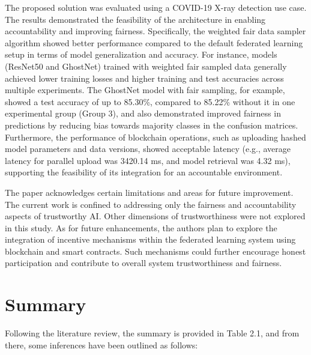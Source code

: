 The proposed solution was evaluated using a COVID-19 X-ray detection use case. The results demonstrated the feasibility of the architecture in enabling accountability and improving fairness. Specifically, the weighted fair data sampler algorithm showed better performance compared to the default federated learning setup in terms of model generalization and accuracy. For instance, models (ResNet50 and GhostNet) trained with weighted fair sampled data generally achieved lower training losses and higher training and test accuracies across multiple experiments. The GhostNet model with fair sampling, for example, showed a test accuracy of up to 85.30\%, compared to 85.22\% without it in one experimental group (Group 3), and also demonstrated improved fairness in predictions by reducing bias towards majority classes in the confusion matrices. Furthermore, the performance of blockchain operations, such as uploading hashed model parameters and data versions, showed acceptable latency (e.g., average latency for parallel upload was 3420.14 ms, and model retrieval was 4.32 ms), supporting the feasibility of its integration for an accountable environment.


The paper acknowledges certain limitations and areas for future improvement. The current work is confined to addressing only the fairness and accountability aspects of trustworthy AI. Other dimensions of trustworthiness were not explored in this study. As for future enhancements, the authors plan to explore the integration of incentive mechanisms within the federated learning system using blockchain and smart contracts. Such mechanisms could further encourage honest participation and contribute to overall system trustworthiness and fairness.



\section{Summary}

\label{sec:lit_survey_inferences}
Following the literature review, the summary is provided in Table 2.1, and from there, some inferences have been outlined as follows:  

